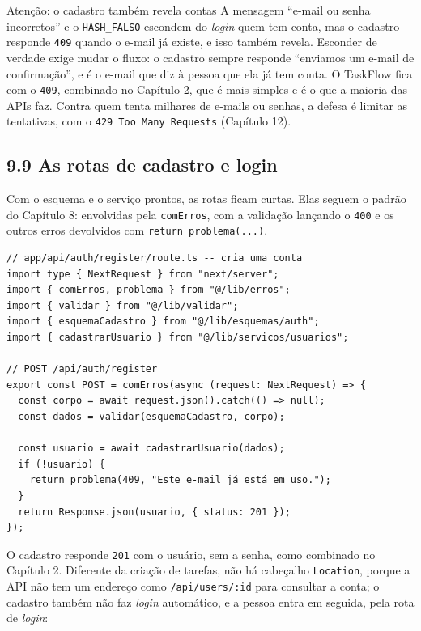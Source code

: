 \begin{destaque}{Atenção: o cadastro também revela contas}
A mensagem ``e-mail ou senha incorretos'' e o \texttt{HASH\_FALSO} escondem do \textit{login} quem tem conta, mas o cadastro responde \texttt{409} quando o e-mail já existe, e isso também revela. Esconder de verdade exige mudar o fluxo: o cadastro sempre responde ``enviamos um e-mail de confirmação'', e é o e-mail que diz à pessoa que ela já tem conta. O TaskFlow fica com o \texttt{409}, combinado no Capítulo 2, que é mais simples e é o que a maioria das APIs faz. Contra quem tenta milhares de e-mails ou senhas, a defesa é limitar as tentativas, com o \texttt{429 Too Many Requests} (Capítulo 12).
\end{destaque}

\subsection{9.9 As rotas de cadastro e login}

Com o esquema e o serviço prontos, as rotas ficam curtas. Elas seguem o padrão do Capítulo 8: envolvidas pela \texttt{comErros}, com a validação lançando o \texttt{400} e os outros erros devolvidos com \texttt{return problema(...)}.

\begin{codigo}
\begin{Verbatim}[breaklines=true, breaksymbolleft={}, fontsize=\footnotesize]
// app/api/auth/register/route.ts -- cria uma conta
import type { NextRequest } from "next/server";
import { comErros, problema } from "@/lib/erros";
import { validar } from "@/lib/validar";
import { esquemaCadastro } from "@/lib/esquemas/auth";
import { cadastrarUsuario } from "@/lib/servicos/usuarios";

// POST /api/auth/register
export const POST = comErros(async (request: NextRequest) => {
  const corpo = await request.json().catch(() => null);
  const dados = validar(esquemaCadastro, corpo);

  const usuario = await cadastrarUsuario(dados);
  if (!usuario) {
    return problema(409, "Este e-mail já está em uso.");
  }
  return Response.json(usuario, { status: 201 });
});
\end{Verbatim}
\end{codigo}

O cadastro responde \texttt{201} com o usuário, sem a senha, como combinado no Capítulo 2. Diferente da criação de tarefas, não há cabeçalho \texttt{Location}, porque a API não tem um endereço como \texttt{/api/users/:id} para consultar a conta; o cadastro também não faz \textit{login} automático, e a pessoa entra em seguida, pela rota de \textit{login}:

